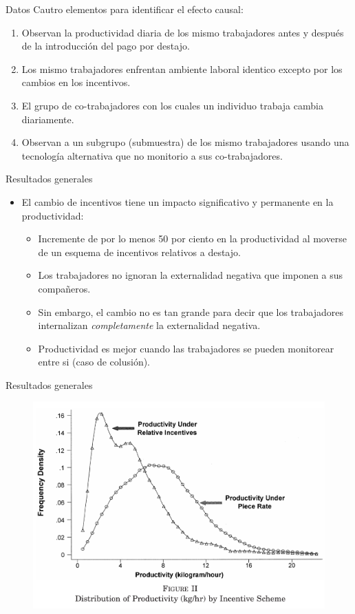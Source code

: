 \documentclass[11pt, aspectratio=169, compress]{beamer}
\begin{document}
\begin{frame}{Datos}
Cautro elementos para identificar el efecto causal: 
\begin{enumerate}
	\item Observan la productividad diaria de los mismo trabajadores antes y después de la introducción del pago por destajo. 
	\item Los mismo trabajadores enfrentan ambiente laboral identico excepto por los cambios en los incentivos. 
	\item El grupo de co-trabajadores con los cuales un individuo trabaja cambia diariamente. 
	\item Observan a un subgrupo (submuestra) de los mismo trabajadores usando una tecnología alternativa que no monitorio a sus co-trabajadores. 
\end{enumerate}
\end{frame}
\begin{frame}{Resultados generales}
\begin{itemize}
	\item El cambio de incentivos tiene un impacto significativo y permanente en la productividad: 
	\begin{itemize}
		\item Incremente de por lo menos 50 por ciento en la productividad al moverse de un esquema de incentivos relativos a destajo. 
		\item Los trabajadores no ignoran la externalidad negativa que imponen a sus compañeros. 
		\item Sin embargo, el cambio no es tan grande para decir que los trabajadores internalizan \textit{completamente} la externalidad negativa. 
		\item Productividad es mejor cuando las trabajadores se pueden monitorear entre si (caso de colusión). 
	\end{itemize}
\end{itemize}
\end{frame}
\begin{frame}{Resultados generales}
\begin{figure}[htb]
	\centering
	\includegraphics[width=.7\textwidth]{fig1}
\end{figure}
\end{frame}
\end{document}
